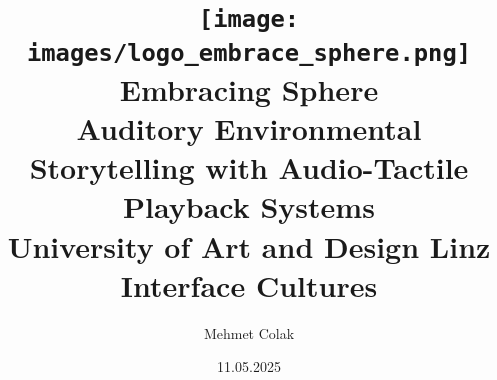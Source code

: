 \begin{titlepage}
  
    \author{Mehmet Colak}
    \title{\texttt{[image: images/logo\_embrace\_sphere.png]}\\[5ex]  Embracing Sphere\\[1ex] 
    \Large Auditory Environmental Storytelling with Audio-Tactile Playback Systems\\[4ex]
    \large University of Art and Design Linz\\[0.5ex]
    Interface Cultures\\[6ex]}
    \date{11.05.2025}

\end{titlepage}

\maketitle